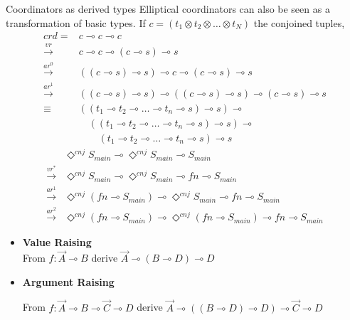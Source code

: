 \documentclass{beamer}
\newcommand{\li}{\!\multimap\!}
\newcommand{\lotimes}{\!\otimes\!}
\begin{document}
\begin{frame}{Coordinators as derived types}
	\small
	Elliptical coordinators can also be seen as a transformation of basic types.
	If $c = (t_1 \lotimes t_2 \lotimes \dots \lotimes t_N)$ the conjoined tuples,
	\begin{align*}
		crd = &c \li c \li c\\
		\overset{vr}{\rightarrow} & c\li c \li (c\li s) \li s\\
		\overset{ar^0}{\rightarrow} & \left( \left(c\li s\right) \li s \right) \li c \li (c\li s) \li s\\
		\overset{ar^1}{\rightarrow} & \left( \left(c\li s\right) \li s \right) \li \left( \left(c\li s\right) \li s \right) \li (c\li s) \li s\\
		\equiv &\left(\left( t_1 \li t_2 \li \dots \li t_n \li s \right) \li s \right) \li \\
		& \quad \left(\left( t_1 \li t_2 \li \dots \li t_n \li s \right) \li s \right) \li \\
		& \quad\quad \left( t_1 \li t_2 \li \dots \li t_n \li s \right) \li s
	\end{align*}
		\begin{align*}
			&\Diamond^{cnj}S_{main} \li \Diamond^{cnj}S_{main} \li S_{main}\\
			\overset{vr^*}{\rightarrow}&\Diamond^{cnj}S_{main} \li \Diamond^{cnj}S_{main} \li fn \li S_{main}\\
		\overset{ar^1}{\rightarrow}&\Diamond^{cnj}(fn \li S_{main}) \li \Diamond^{cnj}S_{main} \li fn \li S_{main}\\
		\overset{ar^2}{\rightarrow}&\Diamond^{cnj}(fn \li S_{main}) \li \Diamond^{cnj}(fn \li S_{main}) \li fn \li S_{main}
		\end{align*}
	\vfill
	\begin{itemize}
		\item \textbf{Value Raising}\\
			{\footnotesize
			From $f: \vec{A}\li B$ derive $\vec{A} \li (B\li D) \li D$
			}
		\item \textbf{Argument Raising}\\
			\begin{footnotesize}
			From $f: \vec{A}\li B \li \vec{C}\li D$ derive $\vec{A}\li ((B\li D)\li D) \li \vec{C} \li D$							\end{footnotesize}
	\end{itemize}
\end{frame}
\end{document}
